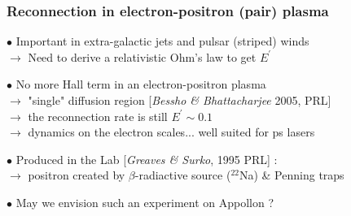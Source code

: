 \documentclass{beamer}
\begin{document}
\begin{frame}
\frametitle{Reconnection in electron-positron (pair) plasma}

$\bullet$ Important in extra-galactic jets and pulsar (striped) winds \\
$\to$ Need to derive a relativistic Ohm's law to get $E^{\prime}$ \\

\bigskip

$\bullet$ No more Hall term in an electron-positron plasma\\
$\to$ "single" diffusion region [\textit{Bessho \& Bhattacharjee} 2005, PRL] \\
$\to$ the reconnection rate is still $E^{\prime} \sim 0.1$ \\
$\to$ dynamics on the electron scales... well suited for ps lasers \\

\bigskip

$\bullet$ Produced in the Lab [\textit{Greaves \& Surko}, 1995 PRL] :\\
$\to$ positron created by $\beta$-radiactive source ($^{22}$Na) \& Penning traps \\

\bigskip

$\bullet$ May we envision such an experiment on Appollon ?

\end{frame}
\end{document}
